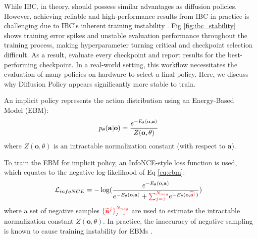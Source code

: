 \documentclass[Afour,sageh,times]{sagej}
\begin{document}
While IBC, in theory, should possess similar advantages as diffusion policies. However, achieving reliable and high-performance results from IBC in practice is challenging due to IBC's inherent training instability \cite{ta2022conditional}. Fig \ref{fig:ibc_stability} shows training error spikes and unstable evaluation performance throughout the training process, making hyperparameter turning critical and checkpoint selection difficult. As a result, \citet{ibc} evaluate every checkpoint and report results for the best-performing checkpoint. In a real-world setting, this workflow necessitates the evaluation of many policies on hardware to select a final policy. Here, we discuss why Diffusion Policy appears significantly more stable to train.


An implicit policy represents the action distribution using an Energy-Based Model (EBM):
\vspace{-2mm}
\begin{equation}
    \label{eq:ebm}
    p_\theta(\mathbf{a}|\mathbf{o})=\frac{e^{-E_\theta(\mathbf{o},\mathbf{a})}}{Z(\mathbf{o},\theta)}
\vspace{-1mm}
\end{equation}
where $Z(\mathbf{o},\theta)$ is an intractable normalization constant (with respect to $\mathbf{a}$). 

To train the EBM for implicit policy, an InfoNCE-style loss function is used, which equates to the negative log-likelihood of Eq \ref{eq:ebm}:
\begin{equation}
    \label{eq:infonce}
    \mathcal{L}_{infoNCE}=-\log(\frac{
        e^{-E_\theta(\mathbf{o},\mathbf{a})}
    }{
        e^{-E_\theta(\mathbf{o},\mathbf{a})} + 
            \textcolor{red}{\sum^{N_{neg}}_{j=1}}e^{
                -E_\theta(\mathbf{o},\textcolor{red}{\widetilde{\mathbf{a}}^j})}
    })
\end{equation}
where a set of negative samples $\textcolor{red}{\{\widetilde{\mathbf{a}}^j\}^{N_{neg}}_{j=1}}$ are used to estimate the intractable normalization constant $Z(\mathbf{o},\theta)$. In practice, the inaccuracy of negative sampling is known to cause training instability for EBMs \cite{du2020improved,ta2022conditional}.
\end{document}
